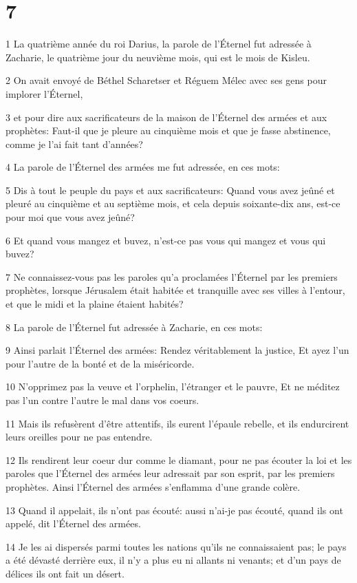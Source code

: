 \chapter{7}

\par 1 La quatrième année du roi Darius, la parole de l'Éternel fut adressée à Zacharie, le quatrième jour du neuvième mois, qui est le mois de Kisleu.
\par 2 On avait envoyé de Béthel Scharetser et Réguem Mélec avec ses gens pour implorer l'Éternel,
\par 3 et pour dire aux sacrificateurs de la maison de l'Éternel des armées et aux prophètes: Faut-il que je pleure au cinquième mois et que je fasse abstinence, comme je l'ai fait tant d'années?
\par 4 La parole de l'Éternel des armées me fut adressée, en ces mots:
\par 5 Dis à tout le peuple du pays et aux sacrificateurs: Quand vous avez jeûné et pleuré au cinquième et au septième mois, et cela depuis soixante-dix ans, est-ce pour moi que vous avez jeûné?
\par 6 Et quand vous mangez et buvez, n'est-ce pas vous qui mangez et vous qui buvez?
\par 7 Ne connaissez-vous pas les paroles qu'a proclamées l'Éternel par les premiers prophètes, lorsque Jérusalem était habitée et tranquille avec ses villes à l'entour, et que le midi et la plaine étaient habités?
\par 8 La parole de l'Éternel fut adressée à Zacharie, en ces mots:
\par 9 Ainsi parlait l'Éternel des armées: Rendez véritablement la justice, Et ayez l'un pour l'autre de la bonté et de la miséricorde.
\par 10 N'opprimez pas la veuve et l'orphelin, l'étranger et le pauvre, Et ne méditez pas l'un contre l'autre le mal dans vos coeurs.
\par 11 Mais ils refusèrent d'être attentifs, ils eurent l'épaule rebelle, et ils endurcirent leurs oreilles pour ne pas entendre.
\par 12 Ils rendirent leur coeur dur comme le diamant, pour ne pas écouter la loi et les paroles que l'Éternel des armées leur adressait par son esprit, par les premiers prophètes. Ainsi l'Éternel des armées s'enflamma d'une grande colère.
\par 13 Quand il appelait, ils n'ont pas écouté: aussi n'ai-je pas écouté, quand ils ont appelé, dit l'Éternel des armées.
\par 14 Je les ai dispersés parmi toutes les nations qu'ils ne connaissaient pas; le pays a été dévasté derrière eux, il n'y a plus eu ni allants ni venants; et d'un pays de délices ils ont fait un désert.

